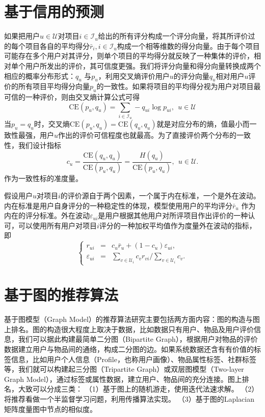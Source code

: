 \section{基于信用的预测}
如果把用户$u\in \mathcal U$对项目$i\in \mathcal I_u$给出的所有评分构成一个评分向量，将其所评价过的每个项目各自的平均得分$\bar r_i, i\in \mathcal I_u$构成一个相等维数的得分向量。由于每个项目可能存在多个用户对其评分，则单个项目的平均得分就反映了一种集体的评价，相对单个用户所发出的评价，其可信度更强。我们将评分向量和得分向量转换成两个相应的概率分布形式：$q_u$ 与$p_u$，利用交叉熵评价用户$u$的评分向量$q_u$相对用户$u$评价的所有项目平均得分向量$p_u$的一致性。如果将项目的平均得分视为用户对项目最可信的一种评价，则由交叉熵计算公式可得
\begin{equation}
    \textrm{CE}(p_u,q_u) = \sum\limits_{i\in \mathcal I_u} -q_{ui}\log p_{ui}, ~~u\in \mathcal U
\end{equation}
当$p_u=q_u$时，交叉熵$\textrm{CE}(p_u,q_u)=\textrm{CE}(q_u,q_u)$就是对应分布的熵，值最小而一致性最强，用户$u$作出的评价可信程度也就最高。为了直接评价两个分布的一致性，我们设计指标
\begin{equation}
    c_u = \frac{\textrm{CE}(q_u, q_u)}{\textrm{CE}(p_u, q_u)} = \frac{H(q_u)}{\textrm{CE}(p_u, q_u)},~~u\in \mathcal U.
\end{equation}
作为一致性标的准度量。

假设用户$u$对项目$i$的评价源自于两个因素，一个属于内在标准，一个是外在波动。内在标准是用户自身评分的一种稳定性的体现，模型使用用户的平均评分$\bar r_u$ 作为内在的评分标准。外在波动$\varepsilon_{ui}$是用户根据其他用户对所评项目作出评价的一种认可，可以使用所有用户对项目$i$评分的一种加权平均值作为度量外在波动的指标，即
\begin{equation}
    \left\{
    \begin{array}{rcl}
        r_{ui} &=& c_u \bar r_u + (1 - c_u) \varepsilon_{ui},\\
        \varepsilon_{ui} &=& \sum\limits_{v\in \mathcal U_i} c_v r_{vi}/\sum\limits_{v\in \mathcal U_i} c_v.
    \end{array}
    \right.
\end{equation}

\section{基于图的推荐算法}
基于图模型（Graph Model）的推荐算法研究主要包括两方面内容：图的构造与图上排名。图的构造很大程度上取决于数据，比如数据只有用户、物品及用户评价信息，我们可以据此构建最简单二分图（Bipartite Graph），根据用户对物品的评价数据建立用户与物品间的通络，构成二分图的边。如果系统数据还含有有价值的标签信息，比如用户个人信息（Profile，也称用户画像）、物品属性标签、社群标签等，我们就可以构建起三分图（Tripartite Graph）或双层图模型（Two-layer Graph Model）\cite{huang2002graph,huang2004graph}，通过标签或属性数据，建立用户、物品间的充分连接。图上排名，大致可以分成三类：
（1）基于图上的随机游走\cite{haveliwala2002topic,jamali2009trustwalker}，使用迭代法速求解。
（2）将推荐看做一个半监督学习问题，利用传播算法实现\cite{zhu2005semi}。
（3）基于图的Laplacian矩阵度量图中节点的相似度\cite{fouss2007random}。

